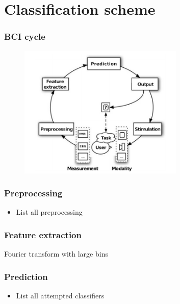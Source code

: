 \documentclass{beamer}
\begin{document}
\section{Classification scheme}

\begin{frame}
  \frametitle{BCI cycle}
  \begin{figure}
    \centering
    \includegraphics[width=0.7\textwidth]{bci_cycle.png}
  \end{figure}
 
\end{frame}

\begin{frame}
  \frametitle{Preprocessing}

  \begin{itemize}
    \item List all preprocessing
  \end{itemize}
\end{frame}

\begin{frame}
  \frametitle{Feature extraction}
    Fourier transform with large bins
\end{frame}

\begin{frame}
  \frametitle{Prediction}

  \begin{itemize}
    \item List all attempted classifiers
  \end{itemize}
\end{frame}
\end{document}
